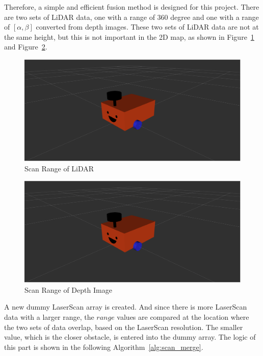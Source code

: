 Therefore, a simple and efficient fusion method is designed for this project. 
There are two sets of LiDAR data, one with a range of 360 degree and one with a range of $[\alpha,\beta]$ converted from depth images. 
These two sets of LiDAR data are not at the same height, but this is not important in the 2D map, as shown in Figure~\ref{fig:lidar_scan} and Figure~\ref{fig:depth_scan}.
\begin{figure}[H]
    \centering
    \includegraphics[width=0.8\linewidth]{figs/robot.png}
    \caption{Scan Range of LiDAR}
    \label{fig:lidar_scan}
\end{figure}
\begin{figure}[H]
    \centering
    \includegraphics[width=0.8\linewidth]{figs/robot.png}
    \caption{Scan Range of Depth Image}
    \label{fig:depth_scan}
\end{figure}
A new dummy LaserScan array is created. And since there is more LaserScan data with a larger range, 
the $range$ values are compared at the location where the two sets of data overlap, 
based on the LaserScan resolution. The smaller value, which is the closer obstacle, 
is entered into the dummy array. The logic of this part is shown in the following Algorithm~\ref{alg:scan_merge}.

